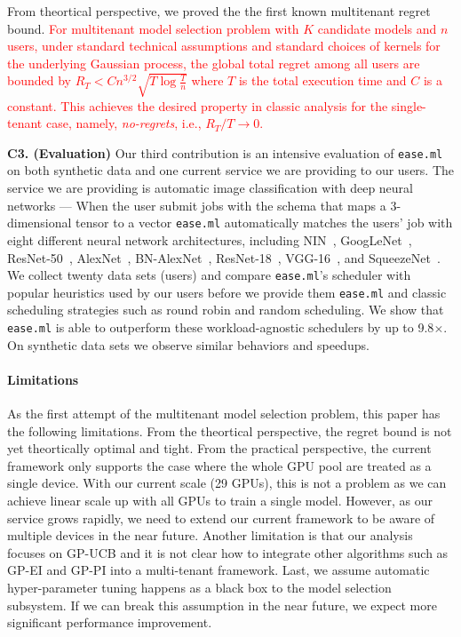 \documentclass[letterpaper]{vldb}
\newcommand{\eml}{\texttt{ease.ml}\xspace}
\begin{document}
From theortical perspective, we proved the
the first known multitenant regret bound. 
\textcolor{red}{For multitenant model selection problem 
with $K$ candidate models and $n$ users,
under standard technical assumptions and standard choices of
kernels for the underlying Gaussian process,
the global total regret among all
users are bounded by 
$
R_T < C n^{3/2}\sqrt{T\log \frac{T}{n}}
$
where $T$ is the total execution time
and $C$ is a constant. This achieves
the desired property in classic analysis for
the single-tenant case, namely, {\em no-regrets}, 
i.e., $R_T/T \rightarrow 0$.
}

\vspace{-0.5em}
\noindent
{\bf C3. (Evaluation)} Our third contribution is an intensive
evaluation of \eml on both synthetic data and one current
service we are providing to our users. The service 
we are providing is automatic image classification 
with deep neural networks ---  When
the user submit jobs with the schema
that maps a 3-dimensional tensor to
a vector \eml automatically matches the users' job with eight
different neural network architectures, including
NIN~\cite{XXX}, GoogLeNet~\cite{XXX}, ResNet-50~\cite{XXX}, AlexNet~\cite{XXX},
BN-AlexNet~\cite{XXX}, ResNet-18~\cite{XXX}, VGG-16~\cite{XXX},
and SqueezeNet~\cite{XXX}. We collect twenty 
data sets (users) and compare
\eml's scheduler with popular heuristics 
used by our users before we provide them
\eml and classic scheduling strategies such
as round robin and random scheduling. We show that
\eml is able to outperform
these workload-agnostic schedulers
by up to 9.8$\times$. On synthetic data sets
we observe similar behaviors and speedups.

\vspace{-1em}
\paragraph*{Limitations}
As the first attempt
of the multitenant model selection problem,
this paper has the following limitations.
From the theortical perspective, the regret bound
is not yet theortically optimal and tight.
From the practical perspective,
the current framework only supports the case where
the whole GPU pool are treated as a single device.
With our current scale (29 GPUs), this is not
a problem as we can achieve linear scale up
with all GPUs to train a single model. However, as our service grows
rapidly, we need to extend our current framework
to be aware of multiple devices in the near future.
Another limitation is that our
analysis focuses on GP-UCB and it is not clear
how to integrate other algorithms such as
GP-EI and GP-PI into a multi-tenant 
framework. Last, we assume
automatic hyper-parameter tuning happens
as a black box to the model selection 
subsystem. If we can break this assumption
in the near future, we expect more significant
performance improvement.
\end{document}
